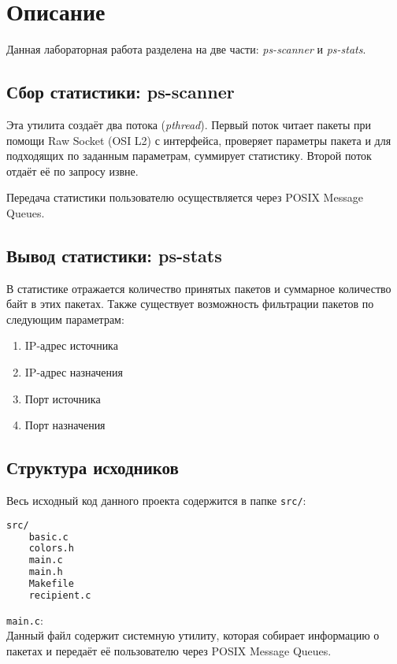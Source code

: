 \section{Описание}

Данная лабораторная работа разделена на две части: \textit{ps-scanner} и \textit{ps-stats}.

\subsection{Сбор статистики: ps-scanner}

Эта утилита создаёт два потока (\textit{pthread}). Первый поток читает пакеты при помощи Raw Socket (OSI L2) с интерфейса, проверяет параметры пакета и для подходящих по заданным параметрам, суммирует статистику. Второй поток отдаёт её по запросу извне.

Передача статистики пользователю осуществляется через POSIX Message Queues.

\subsection{Вывод статистики: ps-stats}

В статистике отражается количество принятых пакетов и суммарное количество байт в этих пакетах. Также существует возможность фильтрации пакетов по следующим параметрам:
\begin{enumerate}
    \item IP-адрес источника
    \item IP-адрес назначения
    \item Порт источника
    \item Порт назначения
\end{enumerate}

\subsection{Структура исходников}

Весь исходный код данного проекта содержится в папке \verb|src/|:

\begin{lstlisting}[language=bash]
src/
    basic.c
    colors.h
    main.c
    main.h
    Makefile
    recipient.c
\end{lstlisting}

\linespace

\indent \verb|main.c|:\\
Данный файл содержит системную утилиту, которая собирает информацию о пакетах и передаёт её пользователю через POSIX Message Queues.

